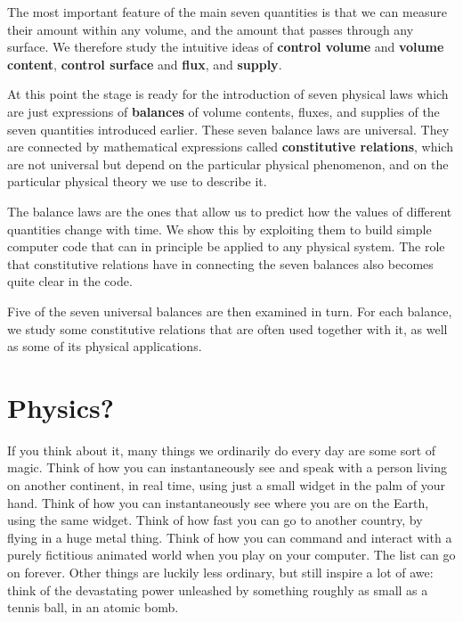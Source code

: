 \documentclass[a4paper,12pt,%
onecolumn,oneside,titlepage,%
british%
]{memoir}
\newcommand{\addsec}[1]{\section*{#1}\addcontentsline{toc}{section}{#1}}
\renewcommand*{\|}[1][]{\nonscript\:#1\vert\nonscript\:\mathopen{}}
\begin{document}
The most important feature of the main seven quantities is that we can measure their amount within any volume, and the amount that passes through any surface. We therefore study the intuitive ideas of \textbf{control volume} and \textbf{volume content}, \textbf{control surface} and \textbf{flux}, and \textbf{supply}.

At this point the stage is ready for the introduction of seven physical laws which are just expressions of \textbf{balances} of volume contents, fluxes, and supplies of the seven quantities introduced earlier. These seven balance laws are universal. They are connected by mathematical expressions called \textbf{constitutive relations}, which are not universal but depend on the particular physical phenomenon, and on the particular physical theory we use to describe it.

The balance laws are the ones that allow us to predict how the values of different quantities change with time. We show this by exploiting them to build simple computer code that can in principle be applied to any physical system. The role that constitutive relations have in connecting the seven balances also becomes quite clear in the code.

Five of the seven universal balances are then examined in turn. For each balance, we study some constitutive relations that are often used together with it, as well as some of its physical applications.

\addsec{Physics?}
\label{sec:physics_general}


If you think about it, many things we ordinarily do every day are some sort of magic. Think of how you can instantaneously see and speak with a person living on another continent, in real time, using just a small widget in the palm of your hand. Think of how you can instantaneously see where you are on the Earth, using the same widget. Think of how fast you can go to another country, by flying in a huge metal thing. Think of how you can command and interact with a purely fictitious animated world when you play on your computer. The list can go on forever. Other things are luckily less ordinary, but still inspire a lot of awe: think of the devastating power unleashed by something roughly as small as a tennis ball, in an atomic bomb.
\end{document}
